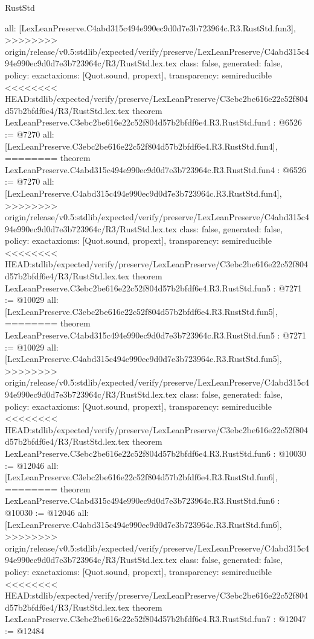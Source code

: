 \begin{lexlean}{RustStd}
\begin{coremodule}
{\begin{coremodule}
{{{{{{{  all: [LexLeanPreserve.C4abd315c494e990ec9d0d7e3b723964c.R3.RustStd.fun3],
>>>>>>>> origin/release/v0.5:stdlib/expected/verify/preserve/LexLeanPreserve/C4abd315c494e990ec9d0d7e3b723964c/R3/RustStd.lex.tex
  class: false,
  generated: false,
  policy: exact{axioms: [Quot.sound, propext]},
  transparency: semireducible
}
<<<<<<<< HEAD:stdlib/expected/verify/preserve/LexLeanPreserve/C3ebc2be616e22c52f804d57b2bfdf6e4/R3/RustStd.lex.tex
theorem LexLeanPreserve.C3ebc2be616e22c52f804d57b2bfdf6e4.R3.RustStd.fun4 : @6526 := @7270 {
  all: [LexLeanPreserve.C3ebc2be616e22c52f804d57b2bfdf6e4.R3.RustStd.fun4],
========
theorem LexLeanPreserve.C4abd315c494e990ec9d0d7e3b723964c.R3.RustStd.fun4 : @6526 := @7270 {
  all: [LexLeanPreserve.C4abd315c494e990ec9d0d7e3b723964c.R3.RustStd.fun4],
>>>>>>>> origin/release/v0.5:stdlib/expected/verify/preserve/LexLeanPreserve/C4abd315c494e990ec9d0d7e3b723964c/R3/RustStd.lex.tex
  class: false,
  generated: false,
  policy: exact{axioms: [Quot.sound, propext]},
  transparency: semireducible
}
<<<<<<<< HEAD:stdlib/expected/verify/preserve/LexLeanPreserve/C3ebc2be616e22c52f804d57b2bfdf6e4/R3/RustStd.lex.tex
theorem LexLeanPreserve.C3ebc2be616e22c52f804d57b2bfdf6e4.R3.RustStd.fun5 : @7271 := @10029 {
  all: [LexLeanPreserve.C3ebc2be616e22c52f804d57b2bfdf6e4.R3.RustStd.fun5],
========
theorem LexLeanPreserve.C4abd315c494e990ec9d0d7e3b723964c.R3.RustStd.fun5 : @7271 := @10029 {
  all: [LexLeanPreserve.C4abd315c494e990ec9d0d7e3b723964c.R3.RustStd.fun5],
>>>>>>>> origin/release/v0.5:stdlib/expected/verify/preserve/LexLeanPreserve/C4abd315c494e990ec9d0d7e3b723964c/R3/RustStd.lex.tex
  class: false,
  generated: false,
  policy: exact{axioms: [Quot.sound, propext]},
  transparency: semireducible
}
<<<<<<<< HEAD:stdlib/expected/verify/preserve/LexLeanPreserve/C3ebc2be616e22c52f804d57b2bfdf6e4/R3/RustStd.lex.tex
theorem LexLeanPreserve.C3ebc2be616e22c52f804d57b2bfdf6e4.R3.RustStd.fun6 : @10030 := @12046 {
  all: [LexLeanPreserve.C3ebc2be616e22c52f804d57b2bfdf6e4.R3.RustStd.fun6],
========
theorem LexLeanPreserve.C4abd315c494e990ec9d0d7e3b723964c.R3.RustStd.fun6 : @10030 := @12046 {
  all: [LexLeanPreserve.C4abd315c494e990ec9d0d7e3b723964c.R3.RustStd.fun6],
>>>>>>>> origin/release/v0.5:stdlib/expected/verify/preserve/LexLeanPreserve/C4abd315c494e990ec9d0d7e3b723964c/R3/RustStd.lex.tex
  class: false,
  generated: false,
  policy: exact{axioms: [Quot.sound, propext]},
  transparency: semireducible
}
<<<<<<<< HEAD:stdlib/expected/verify/preserve/LexLeanPreserve/C3ebc2be616e22c52f804d57b2bfdf6e4/R3/RustStd.lex.tex
theorem LexLeanPreserve.C3ebc2be616e22c52f804d57b2bfdf6e4.R3.RustStd.fun7 : @12047 := @12484 {
}}}}}}}}}}
\end{coremodule}}
\end{coremodule}
\end{lexlean}
